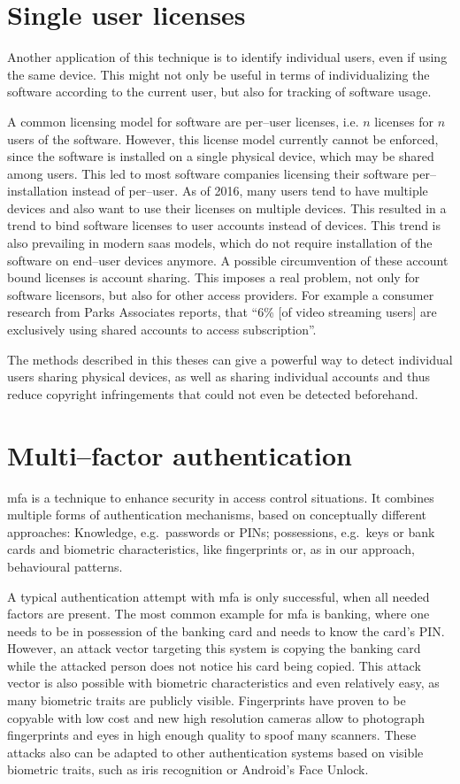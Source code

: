 \section{Single user licenses}
Another application of this technique is to identify individual users, even if using the same device. This might not only be useful in terms of individualizing the software according to the current user, but also for tracking of software usage.

A common licensing model for software are per--user licenses, i.e. $n$ licenses for $n$ users of the software. However, this license model currently cannot be enforced, since the software is installed on a single physical device, which may be shared among users. This led to most software companies licensing their software per--installation instead of per--user.
As of 2016, many users tend to have multiple devices and also want to use their licenses on multiple devices. This resulted in a trend to bind software licenses to user accounts instead of devices. This trend is also prevailing in modern \gls{saas} models, which do not require installation of the software on end--user devices anymore.
A possible circumvention of these account bound licenses is account sharing. This imposes a real problem, not only for software licensors, but also for other access providers. For example a consumer research from Parks Associates\cite{accountsharing} reports, that ``6\% [of video streaming users] are exclusively using shared accounts to access subscription''. 

The methods described in this theses can give a powerful way to detect individual users sharing physical devices, as well as sharing individual accounts and thus reduce copyright infringements that could not even be detected beforehand.

\section{Multi--factor authentication}
\gls{mfa} is a technique to enhance security in access control situations. It combines multiple forms of authentication mechanisms, based on conceptually different approaches: Knowledge, e.g.\ passwords or PINs; possessions, e.g.\ keys or bank cards and biometric characteristics, like fingerprints or, as in our approach, behavioural patterns.

A typical authentication attempt with \gls{mfa} is only successful, when all needed factors are present. The most common example for \gls{mfa} is banking, where one needs to be in possession of the banking card and needs to know the card's PIN. However, an attack vector targeting this system is copying the banking card while the attacked person does not notice his card being copied. This attack vector is also possible with biometric characteristics and even relatively easy, as many biometric traits are publicly visible. Fingerprints have proven to be copyable with low cost\cite{starbug2008bastel} and new high resolution cameras allow to photograph fingerprints and eyes in high enough quality to spoof many scanners\cite{fiebig2014security}. These attacks also can be adapted to other authentication systems based on visible biometric traits, such as iris recognition or Android's Face Unlock.

